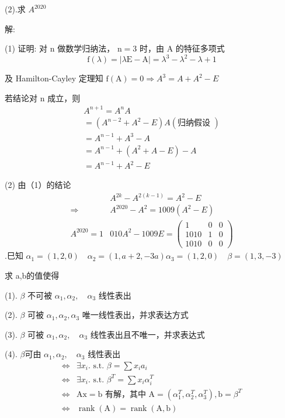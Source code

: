 \documentclass{article}
\begin{document}
(2).求 $A^{2020}$

解:

(1) 证明: 对 $\mathrm{n}$ 做数学归纳法， $\mathrm{n}=3$ 时，由 $\mathrm{A}$ 的特征多项式
$$\mathrm{f}(\lambda)=|\lambda \mathrm{E}-\mathrm{A}|=\lambda^{3}-\lambda^{2}-\lambda+1$$

及 Hamilton-Cayley 定理知 $\mathrm{f}(\mathrm{A})=0 \Rightarrow A^{3}=A+A^{2}-E$

若结论对 $\mathrm{n}$ 成立，则
$$
    \begin{array}{c}
        A^{n+1}=A^{n} A                                    \\
        =\left(A^{n-2}+A^{2}-E\right) A(\text {归纳假设 }) \\
        =A^{n-1}+A^{3}-A                                   \\
        =A^{n-1}+\left(A^{2}+A-E\right)-A                  \\
        =A^{n-1}+A^{2}-E
    \end{array}
$$

(2) 由（1）的结论
$$
    \begin{array}{rl}
                    & A^{2 k}-A^{2(k-1)}=A^{2}-E                                \\
        \Rightarrow & A^{2020}-A^{2}=1009\left(A^{2}-E\right)                   \\
        A^{2020}=1  & 010 A^{2}-1009 E=\left(\begin{array}{ccc}
                1    & 0 & 0 \\
                1010 & 1 & 0 \\
                1010 & 0 & 0
            \end{array}\right)
    \end{array}
$$
\vspace{1ex}
{.}巳知
$\alpha_{1}=(1,2,0) \quad \alpha_{2}=(1, a+2,-3 a) \alpha_{3}=(1,2,0) \quad \beta=(1,3,-3)$

求 a,b的值使得

(1). $\beta$ 不可被 $\alpha_{1}, \alpha_{2}, \quad \alpha_{3}$ 线性表出

(2). $\beta$ 可被 $\alpha_{1}, \alpha_{2}, \alpha_{3}$ 唯一线性表出，并求表达方式

(3). $\beta$ 可被 $\alpha_{1}, \alpha_{2}, \quad \alpha_{3}$ 线性表出且不唯一，并求表达式

(4). $\beta $可由 $\alpha_{1}, \alpha_{2}, \quad \alpha_{3}$ 线性表出
$$
    \begin{aligned}
        \Leftrightarrow & \exists x_{i} . \text { s.t. } \beta=\sum x_{i} a_{i}                                                                                    \\
        \Leftrightarrow & \exists x_{i} . \text { s.t. } \beta^{T}=\sum x_{i} \alpha_{i}^{T}                                                                       \\
        \Leftrightarrow & \mathrm{Ax}=\mathrm{b} \text { 有解，其中 } \mathrm{A}=\left(\alpha_{1}^{T}, \alpha_{2}^{T}, \alpha_{3}^{T}\right), \mathrm{b}=\beta^{T} \\
        \Leftrightarrow & \operatorname{rank}(\mathrm{A})=\operatorname{rank}(\mathrm{A}, \mathrm{b})
    \end{aligned}
$$
\end{document}
